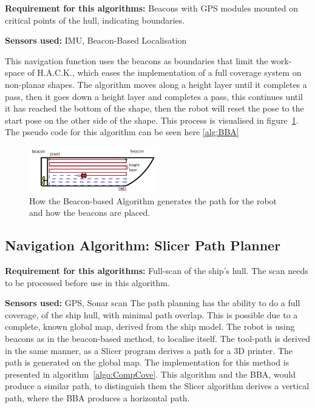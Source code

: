 \textbf{Requirement for this algorithms:} Beacons with GPS modules mounted on critical points of the hull, indicating boundaries.

\textbf{Sensors used:} IMU, Beacon-Based Localisation 

This navigation function uses the beacons as boundaries that limit the work-space of H.A.C.K., which eases the implementation of a full coverage system on non-planar shapes. The algorithm moves along a height layer until it completes a pass, then it goes down a height layer and completes a pass, this continues until it has reached the bottom of the shape, then the robot will reset the pose to the start pose on the other side of the shape. This process is visualised in figure~\ref{fig:globalplannerthatolamadehihi}. The pseudo code for this algorithm can be seen here \ref{alg:BBA} 

\begin{figure}[ht]
    \captionsetup{justification=centering}
    \centering
    \includegraphics[width=0.5\textwidth]{Figures/comparison/boat.png}
    \caption{How the Beacon-based Algorithm generates the path for the robot and how the beacons are placed.}
    \label{fig:globalplannerthatolamadehihi}
\end{figure}



\subsection{Navigation Algorithm: Slicer Path Planner}

\textbf{Requirement for this algorithms:} Full-scan of the ship's hull. The scan needs to be processed before use in this algorithm.

\textbf{Sensors used:} GPS, Sonar scan
The path planning has the ability to do a full coverage, of the ship hull, with minimal path overlap. This is possible due to a complete, known global map, derived from the ship model. The robot is using beacons as in the beacon-based method, to localise itself. The tool-path is derived in the same manner, as a Slicer program derives a path for a 3D printer. The path is generated on the global map. The implementation for this method is presented in algorithm~\ref{algo:CompCove}. This algorithm and the BBA, would produce a similar path, to distinguish them the Slicer algorithm derives a vertical path, where the BBA produces a horizontal path.

